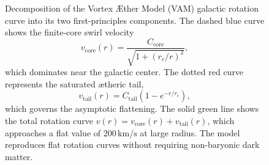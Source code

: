 \documentclass[12pt]{article}
\begin{document}
\begin{figure}[H]
\centering
{}
\caption{
    Decomposition of the Vortex \AE{}ther Model (VAM) galactic rotation curve into its two first-principles components. The dashed blue curve shows the finite-core swirl velocity
    \[
        v_{\text{core}}(r) = \frac{C_{\text{core}}}{\sqrt{1 + (r_c/r)^2}},
    \]
    which dominates near the galactic center. The dotted red curve represents the saturated ætheric tail,
    \[
        v_{\text{tail}}(r) = C_{\text{tail}} (1 - e^{-r/r_c}),
    \]
    which governs the asymptotic flattening. The solid green line shows the total rotation curve \( v(r) = v_{\text{core}}(r) + v_{\text{tail}}(r) \), which approaches a flat value of \( 200\,\mathrm{km/s} \) at large radius. The model reproduces flat rotation curves without requiring non-baryonic dark matter.
}
\label{fig:vam_rotation_profile}
\end{figure}
\end{document}
